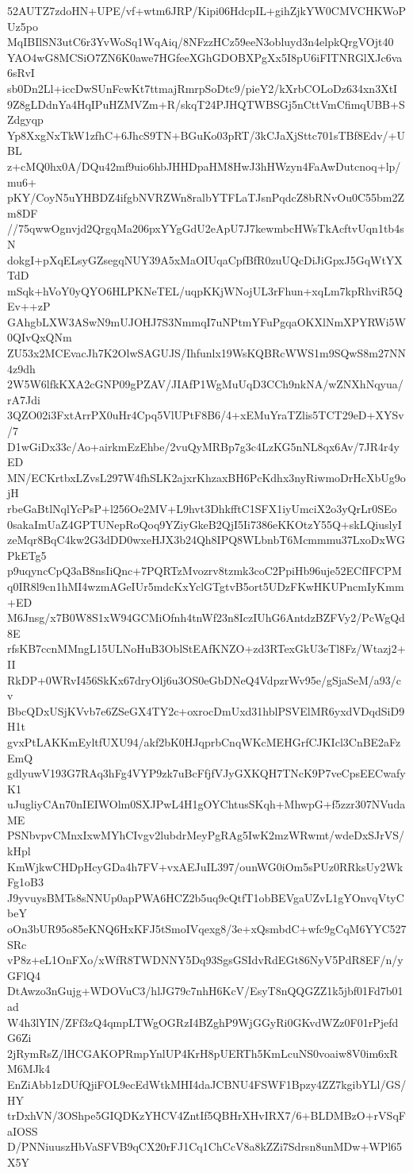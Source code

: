 52AUTZ7zdoHN+UPE/vf+wtm6JRP/Kipi06HdcpIL+gihZjkYW0CMVCHKWoPUz5po
MqIBIlSN3utC6r3YvWoSq1WqAiq/8NFzzHCz59eeN3obluyd3n4elpkQrgVOjt40
YAO4wG8MCSiO7ZN6K0awe7HGfeeXGhGDOBXPgXx5I8pU6iFITNRGlXJc6va6sRvI
sb0Dn2Ll+iccDwSUnFcwKt7ttmajRmrpSoDtc9/pieY2/kXrbCOLoDz634xn3XtI
9Z8gLDdnYa4HqIPuHZMVZm+R/skqT24PJHQTWBSGj5nCttVmCfimqUBB+SZdgyqp
Yp8XxgNxTkW1zfhC+6JhcS9TN+BGuKo03pRT/3kCJaXjSttc701sTBf8Edv/+UBL
z+cMQ0hx0A/DQu42mf9uio6hbJHHDpaHM8HwJ3hHWzyn4FaAwDutcnoq+lp/mu6+
pKY/CoyN5uYHBDZ4ifgbNVRZWn8ralbYTFLaTJsnPqdcZ8bRNvOu0C55bm2Zm8DF
//75qwwOgnvjd2QrgqMa206pxYYgGdU2eApU7J7kewmbcHWsTkAcftvUqn1tb4sN
dokgI+pXqELsyGZsegqNUY39A5xMaOIUqaCpfBfR0zuUQcDiJiGpxJ5GqWtYXTdD
mSqk+hVoY0yQYO6HLPKNeTEL/uqpKKjWNojUL3rFhun+xqLm7kpRhviR5QEv++zP
GAhgbLXW3ASwN9mUJOHJ7S3NmmqI7uNPtmYFuPgqaOKXlNmXPYRWi5W0QIvQxQNm
ZU53x2MCEvacJh7K2OlwSAGUJS/Ihfunlx19WsKQBRcWWS1m9SQwS8m27NN4z9dh
2W5W6lfkKXA2cGNP09gPZAV/JIAfP1WgMuUqD3CCh9nkNA/wZNXhNqyua/rA7Jdi
3QZO02i3FxtArrPX0uHr4Cpq5VlUPtF8B6/4+xEMuYraTZlis5TCT29eD+XYSv/7
D1wGiDx33c/Ao+airkmEzEhbe/2vuQyMRBp7g3c4LzKG5nNL8qx6Av/7JR4r4yED
MN/ECKrtbxLZvsL297W4fhSLK2ajxrKhzaxBH6PcKdhx3nyRiwmoDrHcXbUg9ojH
rbeGaBtlNqlYcPsP+l256Oe2MV+L9hvt3DhkfftC1SFX1iyUmciX2o3yQrLr0SEo
0sakaImUaZ4GPTUNepRoQoq9YZiyGkeB2QjI5Ii7386eKKOtzY55Q+skLQiuslyI
zeMqr8BqC4kw2G3dDD0wxeHJX3b24Qh8IPQ8WLbnbT6Mcmmmu37LxoDxWGPkETg5
p9uqyncCpQ3aB8nsIiQnc+7PQRTzMvozrv8tzmk3coC2PpiHb96uje52ECfIFCPM
q0IR8l9cn1hMI4wzmAGeIUr5mdcKxYclGTgtvB5ort5UDzFKwHKUPncmIyKmm+ED
M6Jnsg/x7B0W8S1xW94GCMiOfnh4tnWf23n8IczIUhG6AntdzBZFVy2/PcWgQd8E
rfsKB7ccnMMngL15ULNoHuB3OblStEAfKNZO+zd3RTexGkU3eTl8Fz/Wtazj2+II
RkDP+0WRvI456SkKx67dryOlj6u3OS0eGbDNeQ4VdpzrWv95e/gSjaSeM/a93/cv
BbcQDxUSjKVvb7e6ZSeGX4TY2c+oxrocDmUxd31hblPSVElMR6yxdVDqdSiD9H1t
gvxPtLAKKmEyltfUXU94/akf2bK0HJqprbCnqWKcMEHGrfCJKIcl3CnBE2aFzEmQ
gdlyuwV193G7RAq3hFg4VYP9zk7uBcFfjfVJyGXKQH7TNcK9P7veCpsEECwafyK1
uJugliyCAn70nIEIWOlm0SXJPwL4H1gOYChtusSKqh+MhwpG+f5zzr307NVudaME
PSNbvpvCMnxIxwMYhCIvgv2lubdrMeyPgRAg5IwK2mzWRwmt/wdeDxSJrVS/kHpl
KmWjkwCHDpHcyGDa4h7FV+vxAEJuIL397/ounWG0iOm5sPUz0RRksUy2WkFg1oB3
J9yvuysBMTs8sNNUp0apPWA6HCZ2b5uq9cQtfT1obBEVgaUZvL1gYOnvqVtyCbeY
oOn3bUR95o85eKNQ6HxKFJ5tSmoIVqexg8/3e+xQsmbdC+wfc9gCqM6YYC527SRc
vP8z+eL1OnFXo/xWfR8TWDNNY5Dq93SgsGSIdvRdEGt86NyV5PdR8EF/n/yGFlQ4
DtAwzo3nGujg+WDOVuC3/hlJG79c7nhH6KcV/EsyT8nQQGZZ1k5jbf01Fd7b01ad
W4h3lYIN/ZFf3zQ4qmpLTWgOGRzI4BZghP9WjGGyRi0GKvdWZz0F01rPjefdG6Zi
2jRymRsZ/lHCGAKOPRmpYnlUP4KrH8pUERTh5KmLcuNS0voaiw8V0im6xRM6MJk4
EnZiAbb1zDUfQjiFOL9ecEdWtkMHI4daJCBNU4FSWF1Bpzy4ZZ7kgibYLl/GS/HY
trDxhVN/3OShpe5GIQDKzYHCV4ZntIf5QBHrXHvIRX7/6+BLDMBzO+rVSqFaIOSS
D/PNNiuuszHbVaSFVB9qCX20rFJ1Cq1ChCcV8a8kZZi7Sdrsn8unMDw+WPl65X5Y
